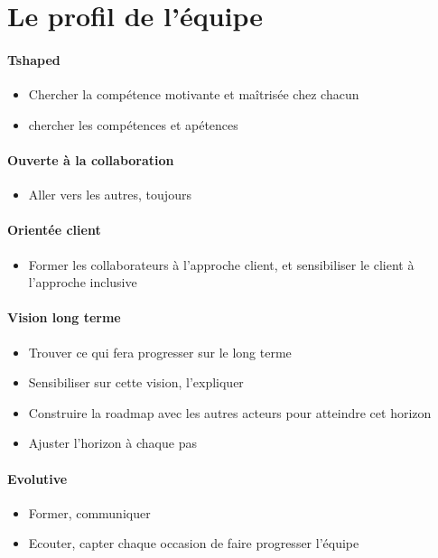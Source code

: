 \section{Le profil de l'équipe}

\begin{frame}{\insertsectionhead}
  \framesubtitle{Tshaped}
    \begin{itemize}
      \item Chercher la compétence motivante et maîtrisée chez chacun
      \item chercher les compétences et apétences
          \end{itemize}
\end{frame}

\begin{frame}{\insertsectionhead}
  \framesubtitle{Ouverte à la collaboration}
 
    \begin{itemize}
      \item Aller vers les autres, toujours
    \end{itemize}
\end{frame}

\begin{frame}{\insertsectionhead}
  \framesubtitle{Orientée client}
    \begin{itemize}
      \item Former les collaborateurs à l'approche client, et sensibiliser le client à l'approche inclusive
    \end{itemize}
\end{frame}

\begin{frame}{\insertsectionhead}
  \framesubtitle{Vision long terme}
    \begin{itemize}
      \item Trouver ce qui fera progresser sur le long terme
      \item Sensibiliser sur cette vision, l'expliquer
      \item Construire la roadmap avec les autres acteurs pour atteindre cet horizon
      \item Ajuster l'horizon à chaque pas
    \end{itemize}
\end{frame}

\begin{frame}{\insertsectionhead}
  \framesubtitle{Evolutive}

    \begin{itemize}
      \item Former, communiquer
      \item Ecouter, capter chaque occasion de faire progresser l'équipe
    \end{itemize}
\end{frame}

